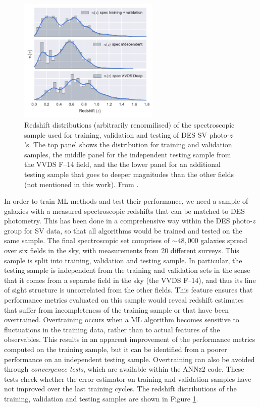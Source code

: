 \begin{figure}\centering \includegraphics[width=0.6\textwidth]{./chapters/chapter2/figs/spec_distrubution_of_machted_cat.pdf}\caption{Redshift distributions (arbitrarily renormilised) of the spectroscopic sample used for training, validation and testing of DES SV photo-$z$'s. The top panel shows the distribution for training and validation samples, the middle panel for the independent testing sample from the VVDS F--14 field, and the the lower panel for an additional testing sample that goes to deeper magnitudes than the other fields (not mentioned in this work). From \citet{bonnett}.}\label{fig:specz}\end{figure}

In order to train ML methods and test their performance, we need a sample of galaxies with a measured spectroscopic redshifts that can be matched to DES photometry. This has been done in a comprehensive way within the DES photo-$z$ group for SV data, so that all algorithms would be trained and tested on the same sample. The final spectroscopic set comprises of $\sim 48,000$ galaxies spread over six fields in the sky, with measurements from 20 different surveys. This sample is split into training, validation and testing sample. In particular, the testing sample is independent from the training and validation sets in the sense that it comes from a separate field in the sky (the VVDS F--14), and thus its line of sight structure is uncorrelated from the other fields. This feature ensures that performance metrics evaluated on this sample would reveal redshift estimates that suffer from incompleteness of the training sample or that have been overtrained. Overtraining occurs when a ML algorithm becomes sensitive to fluctuations in the training data, rather than to actual features of the observables. This results in an apparent improvement of the performance metrics computed on the training sample, but it can be identified from a poorer performance on an independent testing sample. Overtraining can also be avoided through \emph{convergence tests}, which are available within the \textsc{ANNz2} code. These tests check whether the error estimator on training and validation samples have not improved over the last training cycles. The redshift distributions of the training, validation and testing samples are shown in Figure \ref{fig:specz}.

